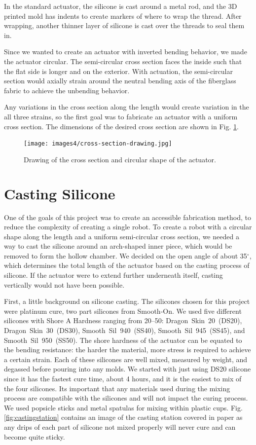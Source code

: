 In the standard actuator, the silicone is cast around a metal rod, and the 3D printed mold has indents to create markers of where to wrap the thread. After wrapping, another thinner layer of silicone is cast over the threads to seal them in. 

Since we wanted to create an actuator with inverted bending behavior, we made the actuator circular. The semi-circular cross section faces the inside such that the flat side is longer and on the exterior. With actuation, the semi-circular section would axially strain around the neutral bending axis of the fiberglass fabric to achieve the unbending behavior. 

Any variations in the cross section along the length would create variation in the all three strains, so the first goal was to fabricate an actuator with a uniform cross section. The dimensions of the desired cross section are shown in Fig. \ref{fig:crosssection}.

\begin{figure}[h]
    \centering
    \texttt{[image: images4/cross-section-drawing.jpg]}
    \caption{Drawing of the cross section and circular shape of the actuator.}
    \label{fig:crosssection}
\end{figure}

\section{Casting Silicone}
One of the goals of this project was to create an accessible fabrication method, to reduce the complexity of creating a single robot. To create a robot with a circular shape along the length and a uniform semi-circular cross section, we needed a way to cast the silicone around an arch-shaped inner piece, which would be removed to form the hollow chamber. We decided on the open angle of about 35$^\circ$, which determines the total length of the actuator based on the casting process of silicone. If the actuator were to extend further underneath itself, casting vertically would not have been possible. 

First, a little background on silicone casting. The silicones chosen for this project were platinum cure, two part silicones from Smooth-On. We used five different silicones with Shore A Hardness ranging from 20--50: Dragon~Skin~20~(DS20), Dragon~Skin~30~(DS30), Smooth~Sil~940~(SS40), Smooth~Sil~945~(SS45), and Smooth~Sil~950~(SS50). The shore hardness of the actuator can be equated to the bending resistance: the harder the material, more stress is required to achieve a certain strain. Each of these silicones are well mixed, measured by weight, and degassed before pouring into any molds. We started with just using DS20 silicone since it has the fastest cure time, about 4 hours, and it is the easiest to mix of the four silicones. Its important that any materials used during the mixing process are compatible with the silicones and will not impact the curing process. We used popsicle sticks and metal spatulas for mixing within plastic cups. Fig. \ref{fig:castingstation} contains an image of the casting station covered in paper as any drips of each part of silicone not mixed properly will never cure and can become quite sticky. 

